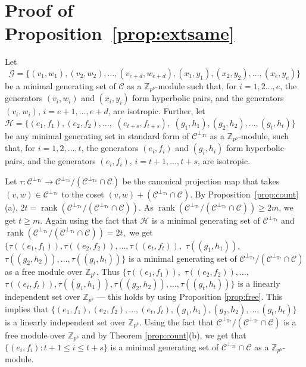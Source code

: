 \documentclass{article}
\DeclareMathOperator{\Tr}{Tr}
\DeclareMathOperator{\rank}{rank}
\theoremstyle{remark}
\theoremstyle{definition}
\numberwithin{equation}{section}
\begin{document}
\section{Proof of Proposition~\ref{prop:extsame}} \label{app:extsame_proof}

 Let  $$\mathcal{G}=\{(v_1,w_1),(v_2,w_2),\ldots, (v_{e+d},w_{e+d}),(x_1,y_1),(x_2,y_2),\ldots, (x_{e},y_{e})\}$$ be a minimal generating set of $\mathcal{C}$ as a $\mathbb{Z}_{p^b}$-module such that, for $i = 1,2\ldots,e$, the generators $(v_i,w_i)$ and $(x_i,y_i)$ form hyperbolic pairs, and the generators $(v_i,w_i)$, $i = e+1,\ldots,e+d$, are isotropic. Further, let $\mathcal{H}=\{(e_1,f_1),(e_2,f_2),\ldots, $ $(e_{t+s},f_{t+s}),$ $(g_1,h_1),(g_2,h_2),\ldots, (g_{t},h_{t})\}$ be any minimal generating set in standard form  of $\mathcal{C}^{\perp_{\Tr}}$  as a $\mathbb{Z}_{p^b}$-module,  such that, for $i = 1,2,\ldots,t$, the generators $(e_i,f_i)$ and $(g_i,h_i)$ form hyperbolic pairs, and the generators $(e_i,f_i)$, $i = t+1,\ldots,t+s$, are isotropic. 
 

Let $\tau : \mathcal{C}^{\perp_{\Tr}}  \to \mathcal{C}^{\perp_{\Tr}}/(\mathcal{C}^{\perp_{\Tr}} \cap \mathcal{C})$ be the canonical projection map that takes $(v,w) \in \mathcal{C}^{\perp_{\Tr}}$ to the coset $(v,w) + (\mathcal{C}^{\perp_{\Tr}} \cap \mathcal{C})$. By Proposition~\ref{prop:count}(a), $2t = \rank(\mathcal{C}^{\perp_{\Tr}}/(\mathcal{C}^{\perp_{\Tr}} \cap \mathcal{C})).$ As $\rank(\mathcal{C}^{\perp_{\Tr}}/(\mathcal{C}^{\perp_{\Tr}} \cap \mathcal{C})) \geq 2m$, we get $t\geq m.$ Again using the fact that $\mathcal{H}$ is a minimal generating set of $\mathcal{C}^{\perp_{\Tr}}$ and  $ \rank(\mathcal{C}^{\perp_{\Tr}}/(\mathcal{C}^{\perp_{\Tr}} \cap \mathcal{C}))=2t,$ we get $\{\tau((e_1,f_1)),\tau((e_2,f_2)),\ldots, \tau((e_{t},f_{t})),$ $\tau((g_1,h_1)),$ $\tau((g_2,h_2)),\ldots,\tau((g_{t},h_{t}))\}$ is a minimal generating set of $\mathcal{C}^{\perp_{\Tr}}/(\mathcal{C}^{\perp_{\Tr}} \cap \mathcal{C}) $ as a free module over $\mathbb{Z}_{p^b}$. 
 Thus $\{\tau((e_1,f_1)),$ $\tau((e_2,f_2)),\ldots, $ $\tau((e_{t},f_{t})),\tau((g_1,h_1)),\tau((g_2,h_2)),\ldots, \tau((g_{t},h_{t}))\}$ is a linearly independent set over $\mathbb{Z}_{p^b}$ --- this holds by using Proposition \ref{prop:free}.  This  implies that $\{(e_1,f_1),(e_2,f_2),\ldots, (e_{t},f_{t}),(g_1,h_1),(g_2,h_2),\ldots, (g_{t},h_{t})\}$ is a linearly independent set over $\mathbb{Z}_{p^b}.$ Using the fact that $\mathcal{C}^{\perp_{\Tr}}/(\mathcal{C}^{\perp_{\Tr}} \cap \mathcal{C}) $ is a free module over $\mathbb{Z}_{p^b}$ and by Theorem \ref{prop:count}(b), we get that $\{(e_i,f_i) : t+1 \leq i \leq t+s\}$ is a minimal generating set of $\mathcal{C}^{\perp_{\Tr}} \cap \mathcal{C}$ as a $\mathbb{Z}_{p^b}$-module.
 
\end{document}
